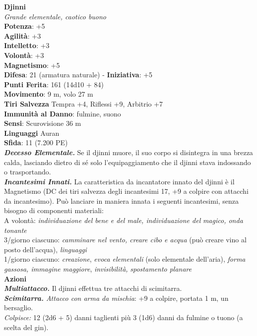 \begin{multicols}{2}
\medskip\textbf{Djinni}\\
\emph{Grande elementale, caotico buono}\\
\textbf{Potenza}: +5\\
\textbf{Agilità}: +3\\
\textbf{Intelletto}: +3\\
\textbf{Volontà}: +3\\
\textbf{Magnetismo}: +5\\
\textbf{Difesa}: 21 (armatura naturale) - \textbf{Iniziativa}: +5\\
\textbf{Punti Ferita}: 161 (14d10 + 84)\\
\textbf{Movimento}: 9 m, volo 27 m\\
\textbf{Tiri Salvezza} Tempra +4, Riflessi +9, Arbitrio +7\\
\textbf{Immunità al Danno}: fulmine, suono\\
\textbf{Sensi}: Scurovisione 36 m\\
\textbf{Linguaggi} Auran\\
\textbf{Sfida}: 11 (7.200 PE)\smallskip\\
\emph{\textbf{Decesso Elementale.}} Se il djinni muore, il suo corpo si disintegra in una brezza calda, lasciando dietro di sé solo l'equipaggiamento che il djinni stava indossando o trasportando.\\
\emph{\textbf{Incantesimi Innati.}} La caratteristica da incantatore innato del djinni è il Magnetismo (DC dei tiri salvezza degli incantesimi 17, +9 a colpire con attacchi da incantesimo). Può lanciare in maniera innata i seguenti incantesimi, senza bisogno di componenti materiali: \\
A volontà: \emph{individuazione del bene e del male, individuazione del} \emph{magico, onda tonante}\\
3/giorno ciascuno: \emph{camminare nel vento, creare cibo e acqua} (può creare vino al posto dell'acqua), \emph{linguaggi}\\
1/giorno ciascuno: \emph{creazione}, \emph{evoca elementali} (solo elementale dell'aria), \emph{forma gassosa, immagine maggiore}, \emph{invisibilità,} \emph{spostamento planare}\\
\smallskip\textbf{Azioni}\\
\emph{\textbf{Multiattacco.}} Il djinni effettua tre attacchi di scimitarra.\\
\emph{\textbf{Scimitarra.} Attacco con arma da mischia}: +9 a colpire, portata 1 m, un bersaglio.\\
\emph{Colpisce:} 12 (2d6 + 5) danni taglienti più 3 (1d6) danni da fulmine o tuono (a scelta del gin).\\

\end{multicols}
